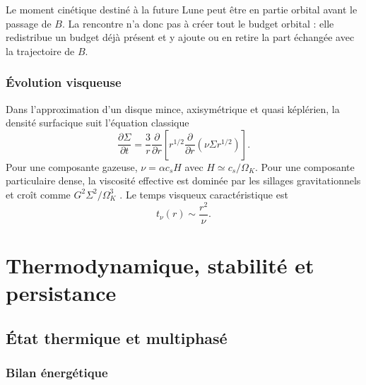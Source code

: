 \documentclass[11pt,a4paper,openany]{report}
\begin{document}
\begin{ideephys}
Le moment cinétique destiné à la future Lune peut être en partie orbital avant le passage de
$B$. La rencontre n'a donc pas à créer tout le budget orbital : elle redistribue un budget déjà
présent et y ajoute ou en retire la part échangée avec la trajectoire de $B$.
\end{ideephys}

\subsection{Évolution visqueuse}

Dans l'approximation d'un disque mince, axisymétrique et quasi képlérien, la densité surfacique
suit l'équation classique \cite{Pringle1981}
\begin{equation}
\frac{\partial\Sigma}{\partial t}=\frac{3}{r}\frac{\partial}{\partial r}
\left[r^{1/2}\frac{\partial}{\partial r}\left(\nu\Sigma r^{1/2}\right)\right].
\label{eq:visc}
\end{equation}
Pour une composante gazeuse, $\nu=\alpha c_sH$ avec $H\simeq c_s/\Omega_K$. Pour une
composante particulaire dense, la viscosité effective est dominée par les sillages
gravitationnels et croît comme $G^2\Sigma^2/\Omega_K^3$ \cite{Daisaka2001}. Le temps
visqueux caractéristique est
\begin{equation}
t_\nu(r)\sim\frac{r^2}{\nu}.
\label{eq:tnu}
\end{equation}


\chapter{Thermodynamique, stabilité et persistance}
\label{ch:thermo}

\section{État thermique et multiphasé}
\subsection{Bilan énergétique}
\end{document}
